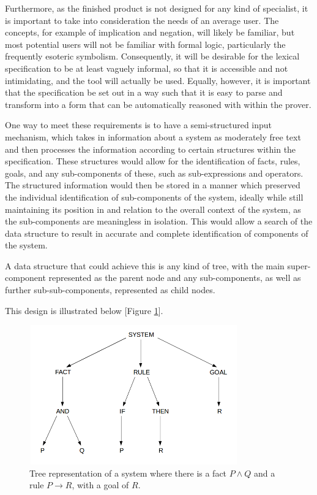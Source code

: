 \documentclass{l4proj}
\begin{document}
Furthermore, as the finished product is not designed for any kind of specialist, it is important to take into consideration the needs of an average user. The concepts, for example of implication and negation, will likely be familiar, but most potential users will not be familiar with formal logic, particularly the frequently esoteric symbolism. Consequently, it will be desirable for the lexical specification to be at least vaguely informal, so that it is accessible and not intimidating, and the tool will actually be used. Equally, however, it is important that the specification be set out in a way such that it is easy to parse and transform into a form that can be automatically reasoned with within the prover. 

One way to meet these requirements is to have a semi-structured input mechanism, which takes in information about a system as moderately free text and then processes the information according to certain structures within the specification. These structures would allow for the identification of facts, rules, goals, and any sub-components of these, such as sub-expressions and operators. The structured information would then be stored in a manner which preserved the individual identification of sub-components of the system, ideally while still maintaining its position in and relation to the overall context of the system, as the sub-components are meaningless in isolation. This would allow a search of the data structure to result in accurate and complete identification of components of the system. 

A data structure that could achieve this is any kind of tree, with the main super-component represented as the parent node and any sub-components, as well as further sub-sub-components, represented as child nodes. 

This design is illustrated below [Figure \ref{figtree}]. 
\begin{figure}[H]
\includegraphics[width=9cm, height=6cm]{figures/systree.png}
\caption[Tree representation of a system]{\label{figtree}Tree representation of a system where there is a fact \(P \land Q\) and a rule \(P \rightarrow R\), with a goal of $R$.}
\end{figure} 
\end{document}
